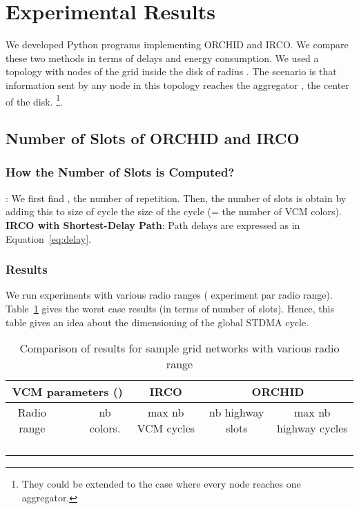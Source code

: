 \section{Experimental Results}\label{sec:exp-res}


We developed Python programs implementing ORCHID and IRCO. 
We compare these two methods in terms of delays and energy consumption.
\newcommand{\OO}{}
We used a topology with nodes of the grid inside the disk of radius . 
The scenario is that information sent by any node in this topology reaches the aggregator \OO, the center of the disk.
\footnote{They could be extended to the case where every node reaches one aggregator.}.

\subsection{Number of Slots of ORCHID and IRCO}\label{sec:slotOrchSimul}
\subsubsection{How the Number of Slots is Computed?} 
: 
We first find , the number of  repetition. Then, the number of slots is obtain by adding this to  size of  cycle   the size of the  cycle (= the number of VCM colors). \\
 {\bf IRCO with Shortest-Delay Path}: Path delays are expressed as in Equation~\ref{eq:delay}.


\subsubsection{Results}
We run experiments with various radio ranges ( experiment par radio range). Table~\ref{tab:orchid-result} gives the worst case results (in terms of number of slots). Hence, this table gives an idea about the dimensioning of the global STDMA cycle. 

\begin{table}[!h]
\centering
\begin{scriptsize}
\begin{tabular}{|c|c|c|c|c|c|c|}\hline
\multicolumn{4}{|c|}{VCM parameters ()} & IRCO &
    \multicolumn{2}{c|}{ORCHID} \\ \hline
Radio range &  &  & nb colors. & max nb VCM cycles  & nb highway slots &  max nb highway cycles\\ \hline
&  & &  &  &  & \\ \hline
&  & &  &  &  & \\ \hline
&  & &  &  &  & \\ \hline
&  & &  &  &  & \\ \hline
 \end{tabular} 
\end{scriptsize}
\caption{Comparison of results for sample grid networks with various
radio range\label{tab:orchid-result}}
\end{table}



